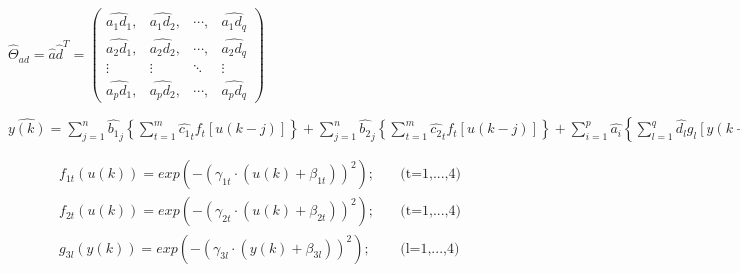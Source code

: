\documentclass[12pt,a4paper]{report}
\begin{document}
$\hat\Theta_{ad}=\hat{a}\hat{d}^T=\begin{pmatrix}
\widehat{a_1d_1}, & \widehat{a_1d_2}, & \cdots , & \widehat{a_1d_q}\\ 
\widehat{a_2d_1}, & \widehat{a_2d_2}, & \cdots, & \widehat{a_2d_q}\\ 
 \vdots &  \vdots & \ddots   &\vdots  \\ 
\widehat{a_pd_1}, & \widehat{a_pd_2}, & \cdots, & \widehat{a_pd_q}
\end{pmatrix}$

$\hat{y(k)}=\sum\limits_{j=1}^n \hat{b_1}_j\left \{  \sum\limits_{t=1}^m\hat{c_1}_tf_t\left [ u(k-j) \right ]\right \}+\sum\limits_{j=1}^n \hat{b_2}_j\left \{\sum\limits_{t=1}^m\hat{c_2}_tf_t\left [u(k-j) \right ]\right \}+\sum\limits_{i=1}^p \hat{a_i}\left \{ \sum\limits_{l=1}^q\hat{d_l}g_l\left [ y(k-i) \right ]\right \} +\eta(k)$

\begin{align*}
f_{1t}(u(k))=exp(-(\gamma _{1t}\cdot( u(k)+\beta _{1t}))^2);\quad  &\text{(t=1,...,4)}\\
f_{2t}(u(k))=exp(-(\gamma _{2t}\cdot (u(k)+\beta_{2t}))^2); \quad   &\text{(t=1,...,4)}\\
g_{3l}(y(k))=exp(-(\gamma_{3l}\cdot (y(k)+\beta _{3l}))^2); \quad     &\text{(l=1,...,4)}\\
\end{align*}
\end{document}
